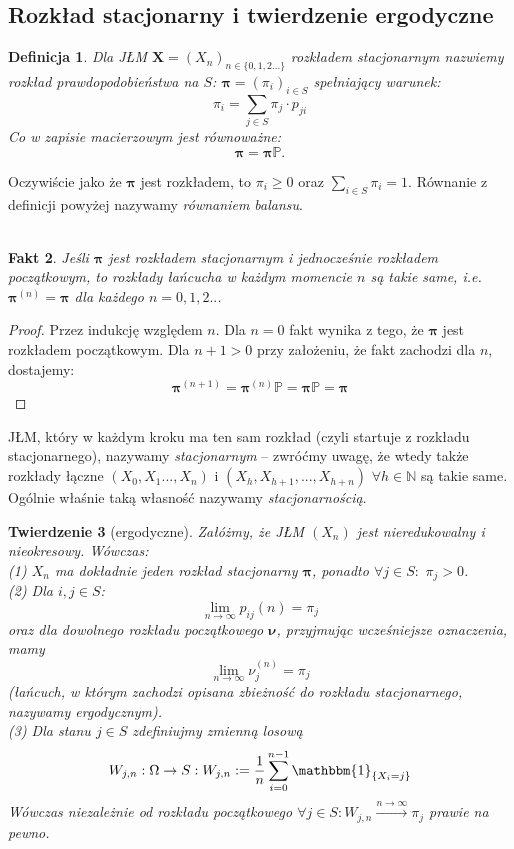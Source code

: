 \documentclass[a4paper]{article}
\theoremstyle{defn}
\newtheorem{defn}{Definicja}[subsection]
\theoremstyle{theorem}
\newtheorem{theorem}[defn]{Twierdzenie}
\theoremstyle{lemma}
\theoremstyle{cor}
\theoremstyle{fact}
\newtheorem{fact}[defn]{Fakt}
\begin{document}
\subsection{Rozkład stacjonarny i twierdzenie ergodyczne}
\label{sect2.2}
\begin{defn}\label{defn2.2.1}
Dla JŁM $\boldsymbol{X} = (X_n)_{n \in \{0,1,2...\}}$ \textit{rozkładem stacjonarnym} nazwiemy rozkład prawdopodobieństwa na $S$: $\boldsymbol{\pi} = (\pi_i)_{i \in S}$ spełniający warunek:
$$\pi_i = \sum\limits_{j \in S} \pi_j \cdot p_{ji}$$
Co w zapisie macierzowym jest równoważne:
$$\boldsymbol{\pi} = \boldsymbol{\pi} \mathbb{P}.$$
\end{defn}
Oczywiście jako że $\boldsymbol{\pi}$ jest rozkładem, to $\pi_i \geq 0$ oraz $\sum\limits_{i \in S} \pi_i = 1$. Równanie z definicji powyżej nazywamy \textit{równaniem balansu}.
\\\\
\begin{fact}\label{fact2.2.2}
Jeśli $\boldsymbol{\pi}$ jest rozkładem stacjonarnym i jednocześnie rozkładem początkowym, to rozkłady łańcucha w każdym momencie $n$ są takie same, i.e. $\boldsymbol{\pi}^{(n)} = \boldsymbol{\pi}$ dla każdego $n = 0,1,2..$.
\end{fact}
\begin{proof}
Przez indukcję względem $n$. Dla $n = 0$ fakt wynika z tego, że $\boldsymbol{\pi}$ jest rozkładem początkowym. Dla $n+1>0$ przy założeniu, że fakt zachodzi dla $n$, dostajemy:
$$\boldsymbol{\pi}^{(n+1)} = \boldsymbol{\pi}^{(n)} \mathbb{P} = \boldsymbol{\pi} \mathbb{P} = \boldsymbol{\pi}$$
\end{proof}
JŁM, który w każdym kroku ma ten sam rozkład (czyli startuje z rozkładu stacjonarnego), nazywamy \textit{stacjonarnym} – zwróćmy uwagę, że wtedy także rozkłady łączne $(X_0, X_1 ..., X_n)$ i $(X_h, X_{h+1}, ..., X_{h+n})$ $\forall h \in \mathbb{N}$ są takie same. Ogólnie właśnie taką własność nazywamy \textit{stacjonarnością}.
\\
\begin{theorem}[ergodyczne]\label{theorem2.2.3}
Załóżmy, że JŁM $(X_n)$ jest nieredukowalny i nieokresowy. Wówczas:\\
(1) $X_n$ ma dokładnie jeden rozkład stacjonarny $\boldsymbol{\pi}$, ponadto $\forall j \in S:\,\, \pi_j > 0$.
\\
(2) Dla $i,j \in S$: $$\lim\limits_{n \to \infty} p_{ij}(n) = \pi_j$$ oraz dla dowolnego rozkładu początkowego $\boldsymbol{\nu}$, przyjmując wcześniejsze oznaczenia, mamy $$\lim\limits_{n \to \infty} \nu_j^{(n)} = \pi_j$$ (łańcuch, w którym zachodzi opisana zbieżność do rozkładu stacjonarnego, nazywamy ergodycznym).
\\
(3) Dla stanu $j \in S$ zdefiniujmy zmienną losową $$W_{j,n}: \Omega \rightarrow S: W_{j,n} :=  \frac{1}{n} \sum\limits_{i = 0}^{n-1} \mathbbm{1}_{\{X_i = j\}}$$
Wówczas niezależnie od rozkładu początkowego $\forall j \in S: W_{j,n} \xrightarrow{{n \rightarrow \infty}} \pi_j$ prawie na pewno.
\end{theorem}
\end{document}
